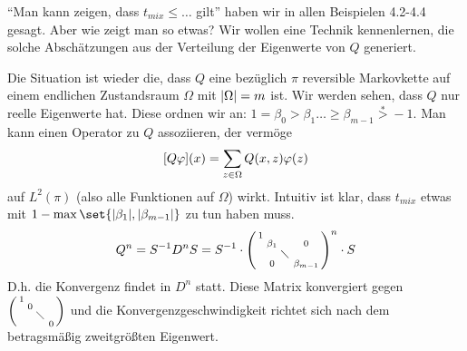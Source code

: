  \enquote{Man kann zeigen, dass $t_{mix} \leq \dots$ gilt} haben wir in allen Beispielen 4.2-4.4  gesagt. Aber wie zeigt man so etwas? Wir wollen eine Technik kennenlernen, die solche Abschätzungen aus der Verteilung der Eigenwerte von $Q$ generiert. 
 
 Die Situation ist wieder die, dass $Q$ eine bezüglich $\pi$ reversible Markovkette auf einem endlichen Zustandsraum $\Omega$ mit $\lvert\Omega\rvert = m$ ist. Wir werden sehen, dass $Q$ nur reelle Eigenwerte hat. Diese ordnen wir an: $1 = \beta_0 > \beta_1 \dots \geq \beta_{m-1} \overset{*}{>} -1$. Man kann einen Operator zu $Q$ assoziieren, der vermöge
 \begin{align}
 	\benb{Q\phi}(x) = \sum\limits_{z \in \Omega} Q(x,z)\phi(z)
 \end{align}
 auf $L^2(\pi)$ (also alle Funktionen auf $\Omega$) wirkt. Intuitiv ist klar, dass $t_{mix}$ etwas mit $1 - \max\set{\abs{\beta_1},\abs{\beta_{m-1}}}$ zu tun haben muss. 
 	\begin{align}
 		Q^n = S^{-1} D^n S = S^{-1} \cdot 
 		\begin{psmallmatrix}
	 		1	&	&	&	 \\
	 			&\beta_1	&	&0	 \\
	 			&	& \diagdown	&	 \\
	 			&	0 & 	& \beta_{m-1}
 		\end{psmallmatrix}^n \cdot S
  	\end{align}
  	D.h. die Konvergenz findet in $D^n$ statt. Diese Matrix konvergiert gegen $\begin{psmallmatrix}
  	1 & & & \\
  	& 0 & & \\
  	& & \diagdown & \\
  	& & & 0
  	\end{psmallmatrix}$ und die Konvergenzgeschwindigkeit richtet sich nach dem betragsmäßig zweitgrößten Eigenwert.
  	
